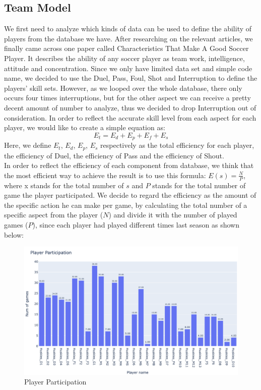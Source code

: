 \documentclass[12pt]{article}
\begin{document}
\subsection{Team Model}
We first need to analyze which kinds of data can be used to define the ability of players from the database we have. After researching on the relevant articles, we finally came across one paper called Characteristics That Make A Good Soccer Player. It describes the ability of any soccer player as team work, intelligence, attitude and concentration. Since we only have limited data set and simple code name, we decided to use the Duel, Pass, Foul, Shot and Interruption to define the players’ skill sets. However, as we looped over the whole database, there only occurs four times interruptions, but for the other aspect we can receive a pretty decent amount of number to analyze, thus we decided to drop Interruption out of consideration. 
In order to reflect the accurate skill level from each aspect for each player, we would like to create a simple equation as: 
\begin{equation*}
 E_t= E_d + E_p + E_f + E_s
\end{equation*}
\newline
Here, we define $E_t$, $E_d$, $E_p$, $E_s$ respectively as the total efficiency for each player, the efficiency of Duel, the efficiency of Pass and the efficiency of Shout.
\\
\newline
In order to reflect the efficiency of each component from database, we think that the most efficient way to achieve the result is to use this formula:
$E(s) = \frac{N}{P} $, where x stands for the total number of $s$ and $P$ stands for the total number of game the player participated. We decide to regard the efficiency as the amount of the specific action he can make per game, by
calculating the total number of a specific aspect from the player ($N$) and divide it with the number of played games ($P$), since each player had played different times last season as shown below: 
\newline
\newline
\newline
\begin{figure}[h]
\begin{center}
\includegraphics[scale=0.5]{images/3.png}
\caption{Player Participation}
\end{center}
\end{figure}
\end{document}
